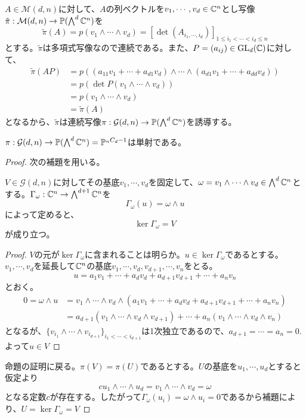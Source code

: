 \documentclass{ltjsreport}
\begin{document}
$A\in\mathcal{M}(d,n)$に対して、$A$の列ベクトルを$v_1,\cdots,v_d\in\mathbb{C}^n$とし写像$\tilde{\pi}:\mathcal{M}(d,n)\rightarrow \mathbb{P}(\bigwedge^d\mathbb{C}^n)$を
\[
\tilde{\pi}(A)=p(v_1\wedge\cdots\wedge v_d)=[\det(A_{i_1,\cdots,i_d})]_{1\leq i_1<\cdots<i_d\leq n}  
\]
とする。$\tilde{\pi}$は多項式写像なので連続である。また、$P=(a_{ij})\in\text{GL}_d(\mathbb{C})$に対して、
\begin{align*}
  \tilde{\pi}(AP)
  &=p\left(
    (a_{11}v_1+\cdots+a_{d1}v_d)\wedge\cdots\wedge
    (a_{d1}v_1+\cdots+a_{dd}v_d)
  \right)\\
  &=p(\det P(v_1\wedge\cdots\wedge v_d))\\
  &=p(v_1\wedge\cdots\wedge v_d)\\
  &=\tilde{\pi}(A)
\end{align*}
となるから、$\tilde{\pi}$は連続写像$\pi:\mathcal{G}(d,n)\rightarrow \mathbb{P}(\bigwedge^d\mathbb{C}^n)$を誘導する。


\begin{prop}[Plucker埋め込み]\label{plucker}
  $\pi:\mathcal{G}(d,n)\rightarrow \mathbb{P}(\bigwedge^d\mathbb{C}^n)=\mathbb{P}^{_{n}C_{d}-1}$は単射である。
\end{prop}

\begin{proof}
  次の補題を用いる。
  \begin{lemm}\label{ker_wedge}
    $V\in\mathcal{G}(d,n)$に対してその基底$v_1,\cdots,v_d$を固定して、$\omega=v_1\wedge\cdots\wedge v_d\in\bigwedge^d\mathbb{C}^n$とする。$\Gamma_\omega:\mathbb{C}^n\rightarrow \bigwedge^{d+1}\mathbb{C}^n$を
    \[
    \Gamma_\omega(u)=\omega\wedge u  
    \]
    によって定めると、
    \begin{equation*}
      \ker\Gamma_\omega =V
    \end{equation*}
    が成り立つ。
  \end{lemm}
  
  \begin{proof}
    $V$の元が$\ker\Gamma_\omega$に含まれることは明らか。$u\in\ker\Gamma_\omega$であるとする。$v_1,\cdots,v_d$を延長して$\mathbb{C}^n$の基底$v_1,\cdots,v_d,v_{d+1},\cdots,v_n$をとる。
    \[
    u=a_{1}v_1+\cdots+a_{d}v_d+a_{d+1}v_{d+1}+\cdots+a_nv_n  
    \]
    とおく。
    \begin{align*}
    0=\omega\wedge u
    &=v_1\wedge\cdots\wedge v_d\wedge(a_{1}v_1+\cdots+a_{d}v_d+a_{d+1}v_{d+1}+\cdots+a_nv_n )  \\
    &=a_{d+1}(v_1\wedge\cdots\wedge v_d\wedge v_{d+1})
        +\cdots+
      a_{n}(v_1\wedge\cdots\wedge v_d\wedge v_{n})
    \end{align*}
    となるが、$\{v_{i_1}\wedge\cdots\wedge v_{i_{d+1}}\}_{i_1<\cdots<i_{d+1}}$は1次独立であるので、$a_{d+1}=\cdots=a_n=0$. よって$u\in V$
  \end{proof}

  命題の証明に戻る。$\pi(V)=\pi(U)$であるとする。$U$の基底を$u_1,\cdots,u_d$とすると仮定より
  \[
  cu_1\wedge\cdots\wedge u_d=v_1\wedge\cdots\wedge v_d=\omega  
  \]
  となる定数$c$が存在する。したがって$\Gamma_\omega(u_i)=\omega\wedge u_i=0$であるから補題により、$U=\ker\Gamma_\omega= V$
\end{proof}
  
\end{document}
